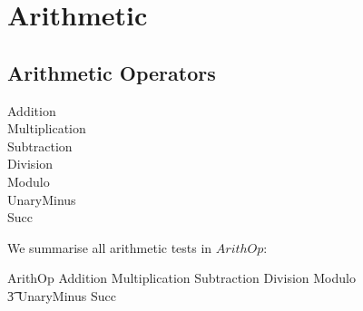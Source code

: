 \documentclass{article}
\begin{document}
\section{Arithmetic}

\subsection{Arithmetic Operators}
\begin{zed}
  Addition \\
  Multiplication \\
  Subtraction \\
  Division \\
  Modulo \\
  UnaryMinus  \\
  Succ \\
\end{zed}
We summarise all arithmetic tests in $ArithOp$:
\begin{zed}
  ArithOp  Addition \land Multiplication \land Subtraction \land Division \land Modulo \land {} \\
  \t3 UnaryMinus \land Succ
\end{zed}
\end{document}
